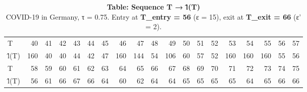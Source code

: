 \begin{table}[t]
\caption*{
{\large \textbf{Table: Sequence T → l̂(T)}} \\ 
{\small COVID-19 in Germany, τ = 0.75. Entry at \textbf{T\_entry = 56} (ε = 15), exit at \textbf{T\_exit = 66} (ε' = 2).}
} 
\begin{tabular*}{\linewidth}{@{\extracolsep{\fill}}lrrrrrrrrrrrrrrrrrr}
\toprule
 &  &  &  &  &  &  &  &  &  &  &  &  &  &  &  &  &  &  \\ 
\midrule\addlinespace[2.5pt]
T & 40 & 41 & 42 & 43 & 44 & 45 & 46 & 47 & 48 & 49 & 50 & 51 & 52 & 53 & 54 & 55 & 56 & 57 \\ 
l̂(T) & 160 & 40 & 40 & 44 & 42 & 47 & 160 & 144 & 54 & 106 & 60 & 57 & 52 & 160 & 160 & 160 & 55 & 56 \\ 
T & 58 & 59 & 60 & 61 & 62 & 63 & 64 & 65 & 66 & 67 & 68 & 69 & 70 & 71 & 72 & 73 & 74 & 75 \\ 
l̂(T) & 56 & 61 & 66 & 67 & 66 & 64 & 60 & 62 & 64 & 64 & 65 & 65 & 65 & 65 & 64 & 65 & 66 & 66 \\ 
\bottomrule
\end{tabular*}
\end{table}

